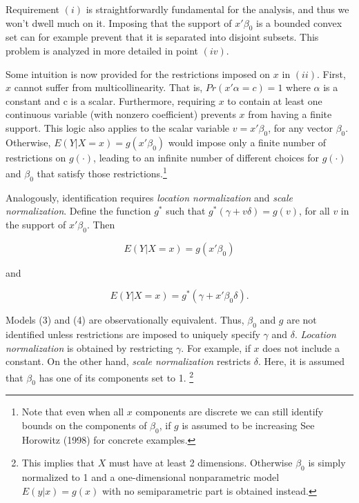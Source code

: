 \documentclass[a4paper]{article}
\begin{document}
Requirement $(i)$ is straightforwardly fundamental for the analysis, and thus we won't dwell much on it. Imposing that the support of $x'\beta_0$ is a bounded convex set can for example prevent that it is separated into disjoint subsets. This problem is analyzed in more detailed in point $(iv)$.

Some intuition is now provided for the restrictions imposed on $x$ in $(ii)$. First, $x$ cannot suffer from multicollinearity. That is, $Pr(x'\alpha = c) = 1$ where $\alpha$ is a constant and c is a scalar. Furthermore, requiring $x$ to contain at least one continuous variable (with nonzero coefficient) prevents $x$ from having a finite support. This logic also applies to  the scalar variable $ v = x'\beta_0 $, for any vector $\beta_0$. Otherwise, $E(Y|X = x) = g(x'\beta_0)$ would impose only a finite number of restrictions on $g(\cdot)$, leading to an infinite number of different choices for $g(\cdot)$ and $\beta_0$ that satisfy those restrictions.\footnote{Note that even when all $x$ components are discrete we can still identify bounds on the components of $\beta_0$, if $g$ is assumed to be increasing See Horowitz (1998) for  concrete examples.} 

Analogously, identification requires \textit{location normalization} and \textit{scale normalization}. Define the function $g^{*}$ such that $g^{*}(\gamma + v\delta) = g(v)$, for all $v$ in the support of $x'\beta_0$. Then

\begin{equation}
E(Y|X = x) = g(x'\beta_0)
\end{equation}

and

\begin{equation}
E(Y|X = x) = g^*(\gamma + x'\beta_0\delta).
\end{equation}

Models (3) and (4) are observationally equivalent. Thus, $\beta_0$ and $g$ are not identified unless restrictions are imposed to uniquely specify $\gamma$ and $\delta$. \textit{Location normalization} is obtained by restricting $\gamma$. For example, if $x$ does not include a constant. On the other hand, \textit{scale normalization} restricts $\delta$. Here, it is assumed that $\beta_0$ has one of its components set to 1. \footnote{This implies that $X$ must have at least 2 dimensions. Otherwise $\beta_0$ is simply normalized to 1 and a one-dimensional nonparametric model $E(y|x) = g(x)$ with no semiparametric part is obtained instead.}
\end{document}
